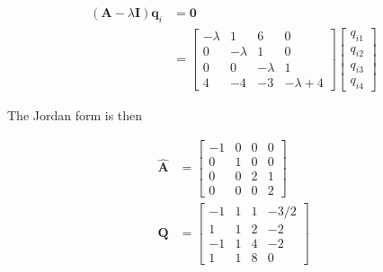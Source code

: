 \begin{itemize}
 \begin{align*}
(\mathbf{A}- \lambda \mathbf{I}) \mathbf{q}_{i} &= \mathbf{0}\\
&=\begin{bmatrix}
 -\lambda & 1 & 6 & 0\\
       0 & -\lambda & 1 & 0\\
       0 & 0 & -\lambda & 1\\
       4 & -4 & -3 & -\lambda +4
\end{bmatrix}
\begin{bmatrix}
 q_{i1}\\q_{i2}\\q_{i3}\\q_{i4}
\end{bmatrix}
 \end{align*}

 The Jordan form is then

  \begin{align*}
 \hat {\mathbf{A}} &= \begin{bmatrix}
                       - 1 & 0 & 0 & 0\\
                       0 & 1 & 0 & 0\\
                       0 & 0 & 2 & 1\\
                       0 & 0 & 0 & 2
                      \end{bmatrix}\\
  \mathbf{Q} &= \begin{bmatrix}
                    -1 & 1 & 1 & -3/2\\
                    1 & 1 & 2 & -2\\
                    -1 & 1 & 4 & -2\\
                    1 & 1 & 8 & 0
  \end{bmatrix}
 \end{align*}

\end{itemize}
